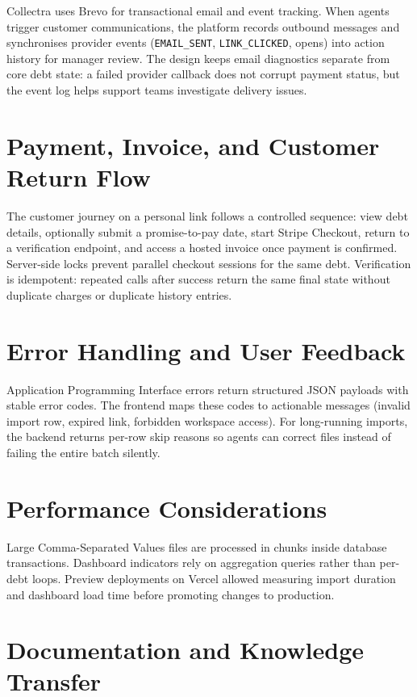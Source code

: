 ﻿\documentclass[12pt,a4paper]{report}
\begin{document}
Collectra uses Brevo for transactional email and event tracking.
When agents trigger customer communications, the platform records outbound messages and
synchronises provider events (\texttt{EMAIL\_SENT}, \texttt{LINK\_CLICKED}, opens) into
action history for manager review.
The design keeps email diagnostics separate from core debt state: a failed provider callback
does not corrupt payment status, but the event log helps support teams investigate delivery issues.

\section{Payment, Invoice, and Customer Return Flow}

The customer journey on a personal link follows a controlled sequence:
view debt details, optionally submit a promise-to-pay date, start Stripe Checkout, return to
a verification endpoint, and access a hosted invoice once payment is confirmed.
Server-side locks prevent parallel checkout sessions for the same debt.
Verification is idempotent: repeated calls after success return the same final state without
duplicate charges or duplicate history entries.

\section{Error Handling and User Feedback}

Application Programming Interface errors return structured JSON payloads with stable error codes.
The frontend maps these codes to actionable messages (invalid import row, expired link,
forbidden workspace access).
For long-running imports, the backend returns per-row skip reasons so agents can correct files
instead of failing the entire batch silently.

\section{Performance Considerations}

Large Comma-Separated Values files are processed in chunks inside database transactions.
Dashboard indicators rely on aggregation queries rather than per-debt loops.
Preview deployments on Vercel allowed measuring import duration and dashboard load time before
promoting changes to production.

\section{Documentation and Knowledge Transfer}
\end{document}

